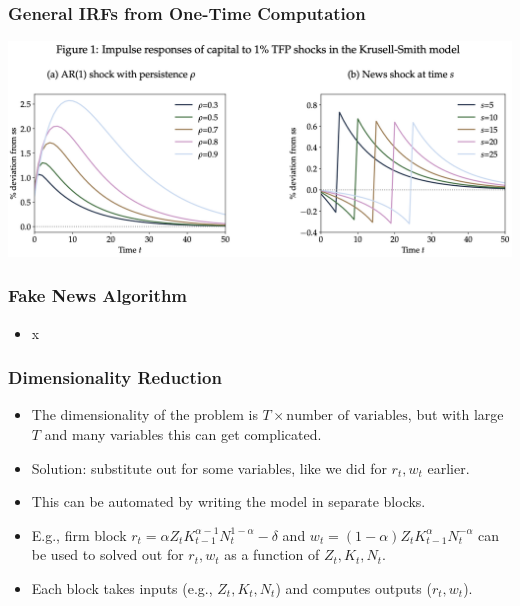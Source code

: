 \documentclass[english,xcolor=svgnames]{beamer}
\begin{document}
\begin{frame}
    \frametitle{General IRFs from One-Time Computation}
    \includegraphics[scale=0.5]{figures/ABRSFIG1.png}
\end{frame}

\begin{frame}
    \frametitle{Fake News Algorithm}
    \begin{itemize}
        \item x
	\end{itemize}
\end{frame}

\begin{frame}
    \frametitle{Dimensionality Reduction}
    \begin{itemize}
    	\item The dimensionality of the problem is $T \times \text{number of variables}$, but with large $T$ and many variables this can get complicated.
    	\item Solution: substitute out for some variables, like we did for $r_t,w_t$ earlier. 
    	\item This can be automated by writing the model in separate blocks.
    	\item E.g., firm block $r_t = \alpha  Z_t K_{t-1}^{\alpha-1} N_t^{1-\alpha} - \delta $ and $ w_t = (1-\alpha) Z_t K_{t-1}^{\alpha} N_t^{-\alpha}$ can be used to solved out for $r_t,w_t$ as a function of $Z_t,K_t,N_t$.
    	\item Each block takes inputs (e.g., $Z_t,K_t,N_t$) and computes outputs ($r_t,w_t$).
	\end{itemize}
\end{frame}
\end{document}
